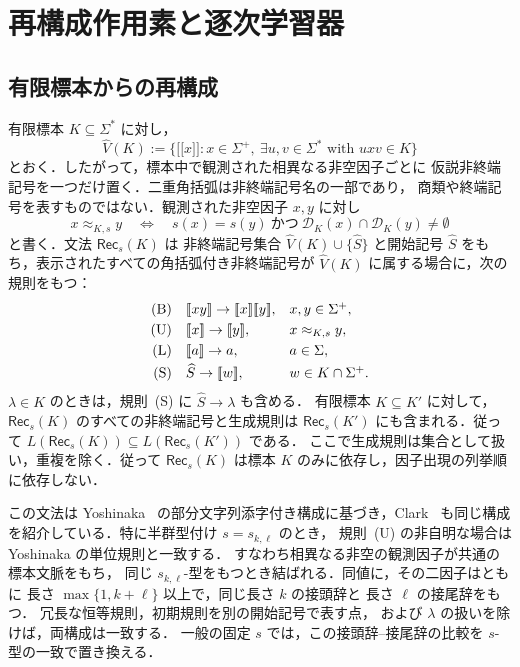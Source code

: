 \documentclass[11pt,a4paper]{ltjsarticle}
\newcommand{\NT}[1]{\mathopen{[\![}#1\mathclose{]\!]}}
\theoremstyle{remark}
\theoremstyle{plain}
\newcommand{\D}{\mathcal{D}}
\begin{document}
\section{再構成作用素と逐次学習器}
\label{sec:algo}

\subsection{有限標本からの再構成}
有限標本 $K\subseteq\Sigma^*$ に対し，
\[
 \widehat V(K):=
 \{\NT{x}:x\in\Sigma^+,\ \exists u,v\in\Sigma^*\text{ with }uxv\in K\}
\]
とおく．したがって，標本中で観測された相異なる非空因子ごとに
仮説非終端記号を一つだけ置く．二重角括弧は非終端記号名の一部であり，
商類や終端記号を表すものではない．観測された非空因子 $x,y$ に対し
\[
 x\approx_{K,s}y
 \quad\Longleftrightarrow\quad
 s(x)=s(y)\ \text{かつ}\ \D_K(x)\cap\D_K(y)\ne\emptyset
\]
と書く．文法 $\mathsf{Rec}_s(K)$ は
非終端記号集合 $\widehat V(K)\cup\{\widehat S\}$ と開始記号
$\widehat S$ をもち，表示されたすべての角括弧付き非終端記号が
$\widehat V(K)$ に属する場合に，次の規則をもつ：
\[
\begin{array}{rll}
\textup{(B)}&\NT{xy}\to\NT{x}\NT{y},&x,y\in\Sigma^+,\\[1mm]
\textup{(U)}&\NT{x}\to\NT{y},&x\approx_{K,s}y,\\[1mm]
\textup{(L)}&\NT{a}\to a,&a\in\Sigma,\\[1mm]
\textup{(S)}&\widehat S\to\NT{w},&w\in K\cap\Sigma^+.
\end{array}
\]
$\lambda\in K$ のときは，規則~\textup{(S)} に
$\widehat S\to\lambda$ も含める．
有限標本 $K\subseteq K'$ に対して，
$\mathsf{Rec}_s(K)$ のすべての非終端記号と生成規則は
$\mathsf{Rec}_s(K')$ にも含まれる．従って
$L(\mathsf{Rec}_s(K))\subseteq L(\mathsf{Rec}_s(K'))$ である．
ここで生成規則は集合として扱い，重複を除く．従って
$\mathsf{Rec}_s(K)$ は標本 $K$ のみに依存し，因子出現の列挙順に依存しない．

この文法は Yoshinaka~\cite[Section~4, Algorithm~1]{yoshinaka2008}
の部分文字列添字付き構成に基づき，Clark~\cite[Section~4, Algorithm~1]{clark2013}
も同じ構成を紹介している．特に半群型付け $s=s_{k,\ell}$ のとき，
規則~\textup{(U)} の非自明な場合は Yoshinaka の単位規則と一致する．
すなわち相異なる非空の観測因子が共通の標本文脈をもち，
同じ $s_{k,\ell}$-型をもつとき結ばれる．同値に，その二因子はともに
長さ $\max\{1,k+\ell\}$ 以上で，同じ長さ $k$ の接頭辞と
長さ $\ell$ の接尾辞をもつ．
冗長な恒等規則，初期規則を別の開始記号で表す点，
および $\lambda$ の扱いを除けば，両構成は一致する．
一般の固定 $s$ では，この接頭辞--接尾辞の比較を
$s$-型の一致で置き換える．
\end{document}
